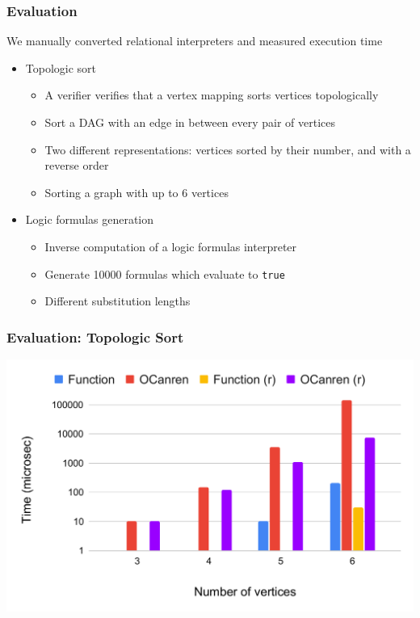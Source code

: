\documentclass[xcolor=table]{beamer}
\begin{document}
\begin{frame}[fragile]
  \frametitle{Evaluation}
  \begin{center}
    We manually converted relational interpreters and measured execution time
  \end{center}

  \begin{itemize}
    \item Topologic sort
    \begin{itemize}
      \item A verifier verifies that a vertex mapping sorts vertices topologically
      \item Sort a DAG with an edge in between every pair of vertices
      \item Two different representations: vertices sorted by their number, and with a reverse order
      \item Sorting a graph with up to 6 vertices
    \end{itemize}
    \item Logic formulas generation
    \begin{itemize}
      \item Inverse computation of a logic formulas interpreter
      \item Generate 10000 formulas which evaluate to \texttt{true}
      \item Different substitution lengths
    \end{itemize}
  \end{itemize}
\end{frame}

\begin{frame}[fragile]
  \frametitle{Evaluation: Topologic Sort}
  \includegraphics[width=\textwidth]{fig/eval/topsort.pdf}
\end{frame}
\end{document}
